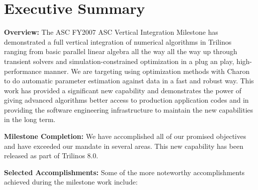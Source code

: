 \documentclass[pdf,ps2pdf,11pt]{SANDreport}
\begin{document}
%
\clearpage
\tableofcontents
\listoffigures
\listoftables



\clearpage

\section{Executive Summary}

%
%

{}\noindent\textbf{Overview:} The ASC FY2007 ASC Vertical Integration
Milestone has demonstrated a full vertical integration of numerical algorithms
in Trilinos ranging from basic parallel linear algebra all the way all the way
up through transient solvers and simulation-constrained optimization in a plug
an play, high-performance manner.  We are targeting using optimization methods
with Charon to do automatic parameter estimation against data in a fast and
robust way.  This work has provided a significant new capability and
demonstrates the power of giving advanced algorithms better access to
production application codes and in providing the software engineering
infrastructure to maintain the new capabilities in the long term.

{}\noindent\textbf{Milestone Completion:} We have accomplished all of our
promised objectives and have exceeded our mandate in several areas.  This new
capability has been released as part of Trilinos 8.0.

{}\noindent\textbf{Selected Accomplishments:} Some of the more noteworthy
accomplishments achieved during the milestone work include:\\[0.5ex]
\end{document}
